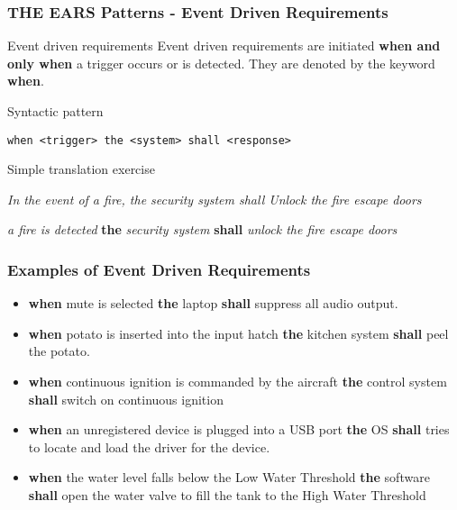 \documentclass[aspectratio=169]{beamer}
\newcommand{\earse}[3]{{\bf \color{mygreen}when} {#1} {\bf \color{mypurple}the} {#2} {\bf \color{mypurple}shall} {#3}}
\begin{document}
\begin{frame}[fragile]
 \frametitle{THE EARS Patterns - Event Driven Requirements}
 \begin{block}{Event driven requirements}
  Event driven requirements are initiated {\bf when and only when} a trigger occurs or is detected. They are denoted  by the keyword {\bf \color{mygreen} when}.
 \end{block}
 \begin{block}{Syntactic pattern}
  \begin{lstlisting}[language=EARS]
             when <trigger> the <system> shall <response>
  \end{lstlisting}
 \end{block}
  \pause
   \begin{block}{Simple translation exercise}
   \begin{description}
   \pause
     \item [Original req:] \textit{In the event of a fire, the security system shall Unlock the fire escape doors}
     \item [In EARS:] \pause \earse{\textit{a fire is detected}}{\textit{security system}}{\textit{unlock the fire escape doors}}
   \end{description}
   \end{block}
\end{frame}  
%
\begin{frame}
  \frametitle{Examples of Event Driven Requirements}
   \begin{example}
   \begin{itemize}
     \item \earse{mute is selected}{laptop}{suppress all audio output}.
     \item \earse{potato is inserted into the input hatch}{kitchen system}{peel the potato}.
     \item \earse{continuous ignition is commanded by the aircraft}{control system}{switch on
continuous ignition}
     \item \earse{an unregistered device is plugged into a USB port}{OS}{tries to locate and load the driver for the device.}
     \item \earse{the water level falls below the Low Water Threshold}{software}{open the water valve
to fill the tank to the High Water Threshold}
   \end{itemize}
   \end{example}
\end{frame}
%
\end{document}
